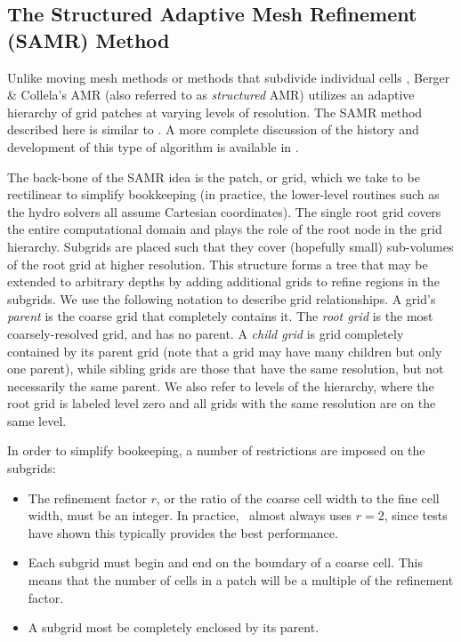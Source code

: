\subsection{The Structured Adaptive Mesh Refinement (SAMR) Method}
\label{sec.amr}


Unlike moving mesh methods \citep{1995ApJS..100..269P,1995ApJS...97..231G} or  methods that subdivide individual cells \citep{Adjerid}, Berger \& Collela's AMR (also referred to as \emph{structured} AMR) utilizes an adaptive hierarchy of grid patches at varying levels of resolution.  The SAMR method described here is similar to \citet{Berger89}.  A more complete discussion of the history and development of this type of algorithm is available in \citet{Neeman96}.

The back-bone of the SAMR idea is the patch, or grid, which we take to be rectilinear to simplify bookkeeping (in practice, the lower-level routines such as the hydro solvers all assume Cartesian coordinates).  The single root grid covers the entire computational domain and plays the role of the root node in the grid hierarchy.  Subgrids are placed such that they cover (hopefully small) sub-volumes of the root grid at higher resolution.  This structure forms a tree that may be extended to arbitrary depths by adding additional grids to refine regions in the subgrids.  We use the following notation to describe grid relationships.  A grid's \textit{parent} is the coarse grid that completely contains it.  The \textit{root grid} is the most coarsely-resolved grid, and has no parent.  A \textit{child grid} is grid completely contained by its parent grid (note that a grid may have many children but only one parent), while sibling grids are those that have the same resolution, but not necessarily the same parent.  We also refer to levels of the hierarchy, where the root grid is labeled level zero and all grids with the same resolution are on the
same level.

In order to simplify bookeeping, a number of restrictions are imposed on the subgrids:
\begin{itemize}
 \item The refinement factor $r$, or the ratio of the coarse cell width to the fine cell width, must be an integer.  In practice, \enzo\ almost always uses $r=2$, since tests have shown this typically provides the best performance.
 \item Each subgrid must begin and end on the boundary of a coarse cell.  This means that the number of cells in a patch will be a multiple of the refinement factor.
 \item A subgrid most be completely enclosed by its parent.
\end{itemize}

